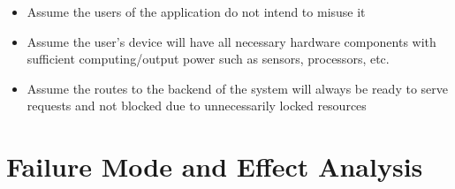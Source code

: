 \documentclass{article}
\begin{document}
\begin{itemize}
    \item Assume the users of the application do not intend to misuse it
    \item Assume the user's device will have all necessary hardware components with sufficient computing/output power such as sensors, processors, etc.
    \item Assume the routes to the backend of the system will always be ready to serve requests and not blocked due to unnecessarily locked resources
\end{itemize}

\section{Failure Mode and Effect Analysis}
\end{document}
